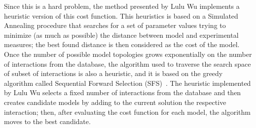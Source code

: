 Since this is a hard problem, the method presented by Lulu Wu 
implements a heuristic version of this cost function. This heuristics 
is based on a Simulated Annealing procedure that searches for a set of 
parameter values trying to minimize (as much as possible) the distance 
between model and experimental measures; the best found distance is then
considered as the cost of the model. Once the number of possible model 
topologies grows exponentially on the number of interactions from the 
database, the algorithm used to traverse the search space of subset of 
interactions is also a heuristic, and it is based on the greedy 
algorithm called Sequential Forward Selection (SFS)~\cite{Whitney1971}.
The heuristic implemented by Lulu Wu selects a fixed number of 
interactions from the database and then creates candidate models by 
adding to the current solution the respective interaction; then, after 
evaluating the cost function for each model, the algorithm moves to the 
best candidate.


